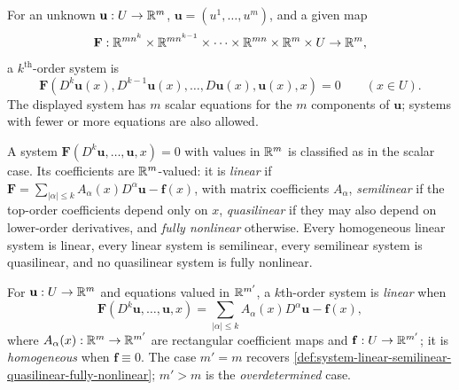 \begin{definition}
\label{def:kth-order-system-pde}





For an unknown $\mathbf{u}:U\to\mathbb{R}^m$, $\mathbf{u}=(u^1,\ldots,u^m)$, and a given map
$$\mathbf{F} : \mathbb{R}^{mn^k} \times \mathbb{R}^{mn^{k-1}} \times \cdots \times \mathbb{R}^{mn} \times \mathbb{R}^m \times U \to \mathbb{R}^m,$$
a $k^{\text{th}}$-order system is
\begin{equation}
\mathbf{F}(D^k \mathbf{u}(x), D^{k-1}\mathbf{u}(x), \ldots, D\mathbf{u}(x), \mathbf{u}(x), x) = 0 \qquad (x \in U).
\tag{2}
\end{equation}
The displayed system has $m$ scalar equations for the $m$ components of $\mathbf{u}$; systems with fewer or more equations are also allowed.
\end{definition}

\begin{definition}
\label{def:system-linear-semilinear-quasilinear-fully-nonlinear}





A system $\mathbf{F}(D^k\mathbf{u}, \ldots, \mathbf{u}, x)=0$ with values in $\mathbb{R}^m$ is classified as in the scalar case. Its coefficients are $\mathbb{R}^m$-valued: it is \emph{linear} if $\mathbf{F} = \sum_{|\alpha|\le k} A_\alpha(x) D^\alpha\mathbf{u} - \mathbf{f}(x)$, with matrix coefficients $A_\alpha$, \emph{semilinear} if the top-order coefficients depend only on $x$, \emph{quasilinear} if they may also depend on lower-order derivatives, and \emph{fully nonlinear} otherwise. Every homogeneous linear system is linear, every linear system is semilinear, every semilinear system is quasilinear, and no quasilinear system is fully nonlinear.
\end{definition}

\begin{definition}
\label{def:non-square-linear-system}





For $\mathbf{u}:U\to\mathbb{R}^m$ and equations valued in $\mathbb{R}^{m'}$, a $k$th-order system is \emph{linear} when
$$\mathbf{F}(D^k\mathbf{u}, \ldots, \mathbf{u}, x) = \sum_{|\alpha|\le k} A_\alpha(x) D^\alpha\mathbf{u} - \mathbf{f}(x),$$
where $A_\alpha(x):\mathbb{R}^m\to\mathbb{R}^{m'}$ are rectangular coefficient maps and $\mathbf{f}:U\to\mathbb{R}^{m'}$; it is \emph{homogeneous} when $\mathbf{f}\equiv0$. The case $m'=m$ recovers \cref{def:system-linear-semilinear-quasilinear-fully-nonlinear}; $m'>m$ is the \emph{overdetermined} case.
\end{definition}

